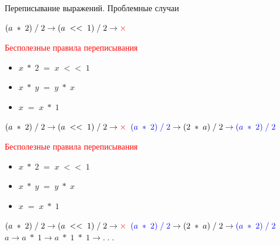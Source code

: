 \documentclass[aspectratio=169
  , xcolor={svgnames}
  , russian  %
  ]{beamer}
\begin{document}
\begin{frame}{Переписывание выражений. Проблемные случаи}

{
    \LARGE{ \centering
    $(a \; *\; 2)\; / \;2 \rightarrow (a \;<<\; 1) \;/ \;2 \rightarrow \textcolor{red}{\Huge \times}$
    } \newline \newline
    
    \vspace{1cm} %
    
    {\fontsize{15.1}{12}\selectfont \textcolor{red}{Бесполезные правила переписывания}}
    {\fontsize{16.1}{12}\selectfont %
    \begin{itemize}
        \item $x\; * \;2 \; = \;  x \; << \; 1$
        \item $x \;*\; y \;= \;y \;* \;x$
        \item $x \;= \;x \;* \;1$ 
    \end{itemize}
    }
}

{
    \LARGE{ \centering
    $(a \; *\; 2)\; / \;2 \rightarrow (a \;<<\; 1) \;/ \;2 \rightarrow \textcolor{red}{\Huge \times}$
    } \newline \newline
    \LARGE{ \centering
    $\textcolor{blue}{(a \;*\; 2) \;/\; 2} \rightarrow (2 \;*\; a) \;/\; 2 \rightarrow \textcolor{blue}{(a \;*\; 2) \;/\; 2}$
    }
    
    \vspace{1cm} %
    
    {\fontsize{15.1}{12}\selectfont \textcolor{red}{Бесполезные правила переписывания}}
    {\fontsize{16.1}{12}\selectfont %
    \begin{itemize}
        \item $x\; * \;2 \; = \;  x \; << \; 1$
        \item $x \;*\; y \;= \;y \;* \;x$
        \item $x \;= \;x \;* \;1$ 
    \end{itemize}
    }
}

{
    \LARGE{ \centering
    $(a \; *\; 2)\; / \;2 \rightarrow (a \;<<\; 1) \;/ \;2 \rightarrow \textcolor{red}{\Huge \times}$
    } \newline \newline
    \LARGE{ \centering
    $\textcolor{blue}{(a \;*\; 2) \;/\; 2} \rightarrow (2 \;*\; a) \;/\; 2 \rightarrow \textcolor{blue}{(a \;*\; 2) \;/\; 2}$
    } \newline \newline
    \LARGE{ \centering
    $a \rightarrow a \; * \; 1 \rightarrow a \; * \; 1 \;*\; 1 \rightarrow .\;.\;.$
    }
    
}
\end{frame}
\end{document}
